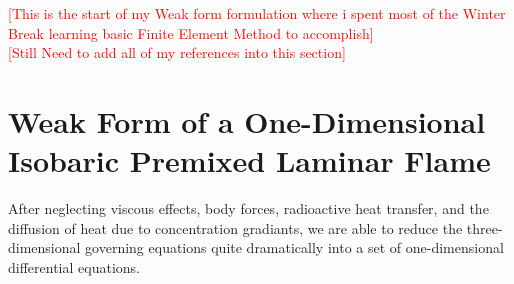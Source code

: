 \documentclass{article}
\newcommand{\red}[1]{\textcolor{red}{[#1]}} %
\begin{document}
\vspace{5mm}
\red{This is the start of my Weak form formulation where i spent most of the Winter Break learning basic Finite Element Method to accomplish}\\
\vspace{5mm}
\red{Still Need to add all of my references into this section}\\

\section{Weak Form of a One-Dimensional Isobaric Premixed Laminar Flame}

After neglecting viscous effects, body forces, radioactive heat transfer, and the diffusion of heat due to concentration gradiants, we are able to reduce the three-dimensional governing equations quite dramatically into a set of one-dimensional differential equations.
\end{document}
